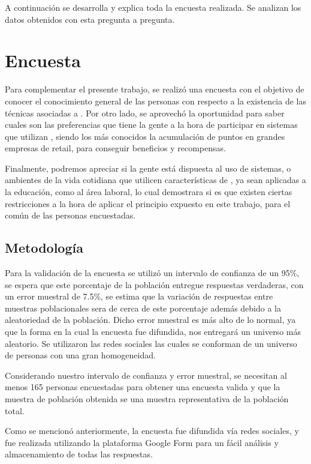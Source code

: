 A continuación se desarrolla y explica toda la encuesta realizada. Se analizan los datos obtenidos
con esta pregunta a pregunta.

\section{Encuesta}

Para complementar el presente trabajo, se realizó una encuesta con el objetivo de
conocer el conocimiento general de las personas con respecto a la existencia
de las técnicas asociadas a {\GAM}.
Por otro lado, se aprovechó la oportunidad para saber cuales son las preferencias
que tiene la gente a la hora de participar en sistemas que utilizan {\GAM},
siendo los más conocidos la acumulación de puntos en grandes empresas de retail,
para conseguir beneficios y recompensas.

Finalmente, podremos apreciar si la gente está dispuesta al uso de sistemas,
o ambientes de la vida cotidiana que utilicen características de {\GAM},
ya sean aplicadas a la educación, como al área laboral, lo cual demostrara
 si es que existen ciertas restricciones a la hora de aplicar
el principio expuesto en este trabajo, para el común de las personas
encuestadas.

\subsection{Metodología}

Para la validación de la encuesta se utilizó un intervalo de confianza de un 95\%, se espera que
este porcentaje de la población entregue respuestas verdaderas, con un error
muestral de 7.5\%, se estima que la variación de respuestas entre muestras poblacionales
 sera de cerca de este porcentaje además debido a la aleatoriedad de la población.
Dicho error muestral es más alto de lo normal, ya que la forma en la cual la encuesta fue difundida,
 nos entregará un universo más aleatorio. Se utilizaron las redes sociales las cuales
se conforman de un universo de personas con una gran homogeneidad.

Considerando nuestro intervalo de confianza y error muestral, se necesitan al menos 165
personas encuestadas para obtener una encuesta valida y que la muestra de población obtenida
se una muestra representativa de la población total.

Como se mencionó anteriormente, la encuesta fue difundida vía redes sociales,
y fue realizada utilizando la plataforma Google Form para un fácil análisis y almacenamiento
 de todas las respuestas.

